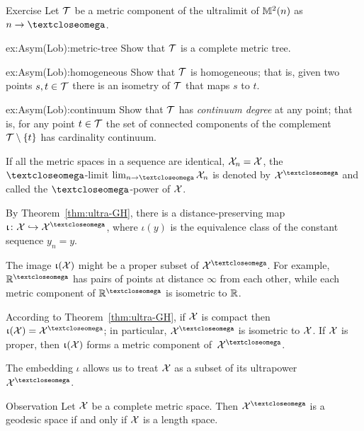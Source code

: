 \begin{thm}{Exercise}\label{ex:Asym(Lob)}
Let $\mathcal{T}$ be a metric component of the ultralimit of $\mathbb{M}_{{}}^{2}({n})$ as $n\to\o$.

\begin{subthm}{ex:Asym(Lob):metric-tree}
Show that $\mathcal{T}$ is a complete metric tree.
\end{subthm}

\begin{subthm}{ex:Asym(Lob):homogeneous}
Show that $\mathcal{T}$ is homogeneous; that is, given two points $s,t\in \spc{T}$ there is an isometry of $\mathcal{T}$ that maps $s$ to $t$.
\end{subthm}

\begin{subthm}{ex:Asym(Lob):continuum}
Show that $\mathcal{T}$ has \emph{continuum degree} at any point;
that is, for any point $t\in \spc{T}$ the set of connected components of the complement $\mathcal{T}\setminus\{t\}$ has cardinality continuum.
\end{subthm}

\end{thm}

 If all the metric spaces in a sequence are identical, $\spc{X}_n\z=\spc{X}$, 
the $\o$-limit 
$\lim_{n\to\o}\spc{X}_n$
is denoted by $\spc{X}^\o$
and called the  $\o$-power of $\mathcal{X}$.
 
By Theorem~\ref{thm:ultra-GH},
there is a distance-preserving map
$\iota\:\spc{X}\hookrightarrow \spc{X}^\o$, where $\iota(y)$ is the equivalence class of the constant sequence $y_n=y$. 

The image $\upiota(\mathcal{X})$ might be a proper subset of $\spc{X}^\o$.
For example, $\RR^\o$ has pairs of points at distance $\infty$ from each other, while each metric component of $\RR^\o$ is isometric to $\mathbb{R}$.

According to Theorem~\ref{thm:ultra-GH}, 
if $\mathcal{X}$ is compact then $\iota(\spc{X})=\spc{X}^\o$;
in particular, $\spc{X}^\o$ is isometric to $\mathcal{X}$.
If $\mathcal{X}$ is proper, then $\upiota(\mathcal{X})$ forms a metric component of~$\spc{X}^\o$.

The embedding $\iota$ allows us to treat $\mathcal{X}$ as a subset of its ultrapower~$\spc{X}^\o$. 

\begin{thm}{Observation}\label{obs:ultrapower-is-geodesic}
Let $\mathcal{X}$ be a complete metric space. 
Then $\spc{X}^\o$ is a geodesic space if and only if $\mathcal{X}$ is a length space.
\end{thm}

